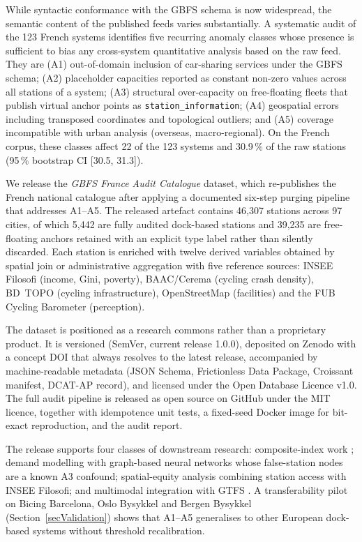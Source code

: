 \documentclass[11pt,a4paper]{article}
\begin{document}
While syntactic conformance with the GBFS schema is now widespread,
the semantic content of the published feeds varies substantially. A
systematic audit of the 123 French systems identifies five recurring
anomaly classes whose presence is sufficient to bias any cross-system
quantitative analysis based on the raw feed. They are (A1) out-of-domain
inclusion of car-sharing services under the GBFS schema; (A2)
placeholder capacities reported as constant non-zero values across all
stations of a system; (A3) structural over-capacity on free-floating
fleets that publish virtual anchor points as
\texttt{station\_information}; (A4) geospatial errors including
transposed coordinates and topological outliers; and (A5) coverage
incompatible with urban analysis (overseas, macro-regional). On the
French corpus, these classes affect 22 of the 123 systems and 30.9\,\%
of the raw stations (95\,\% bootstrap CI [30.5, 31.3]).

We release the \emph{GBFS France Audit Catalogue} dataset, which
re-publishes the French national catalogue after applying a
documented six-step purging pipeline that addresses A1--A5. The
released artefact contains 46{,}307 stations across 97 cities, of
which 5{,}442 are fully audited dock-based stations and 39{,}235 are
free-floating anchors retained with an explicit type label rather than
silently discarded. Each station is enriched with twelve derived
variables obtained by spatial join or administrative aggregation with
five reference sources: INSEE Filosofi (income, Gini, poverty),
BAAC/Cerema (cycling crash density), BD~TOPO (cycling infrastructure),
OpenStreetMap (facilities) and the FUB Cycling Barometer (perception).

The dataset is positioned as a research commons rather than a
proprietary product. It is versioned (SemVer, current release 1.0.0),
deposited on Zenodo with a concept DOI that always resolves to the
latest release, accompanied by machine-readable metadata (JSON Schema,
Frictionless Data Package, Croissant manifest, DCAT-AP record), and
licensed under the Open Database Licence v1.0. The full audit pipeline
is released as open source on GitHub under the MIT licence, together
with idempotence unit tests, a fixed-seed Docker image for bit-exact
reproduction, and the audit report.

The release supports four classes of downstream research:
composite-index work \cite{Fosse2026imd}; demand modelling with
graph-based neural networks \cite{Lin2018BSSGraph} whose false-station
nodes are a known A3 confound; spatial-equity analysis combining
station access with INSEE Filosofi; and multimodal integration with
GTFS \cite{MobilityData2024Validator}. A transferability pilot on
Bicing Barcelona, Oslo Bysykkel and Bergen Bysykkel
(Section~\ref{secValidation}) shows that A1--A5 generalises to other
European dock-based systems without threshold recalibration.
\end{document}
